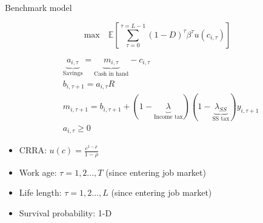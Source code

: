 \documentclass{beamer}
\begin{document}
\begin{frame}{Benchmark model}

\begin{equation*}
	\textrm{max}\quad  \mathbb{E}\left[\sum^{\tau=L-1}_{\tau=0}(1-D)^\tau\beta^\tau u(c_{i,\tau})\right] 
\end{equation*}



\begin{equation*}
	\begin{split}
		& \underbrace{a_{i,\tau}}_{\text{Savings}} = \underbrace{m_{i,\tau}}_{\text{Cash in hand}} - c_{i,\tau} \\
		& b_{i,\tau+1} = a_{i,\tau} R  \\
		& m_{i,\tau+1}   = b_{i,\tau+1}+(1-\underbrace{\lambda}_{\text{Income tax}})(1-\underbrace{\lambda_{SS}}_{\text{SS tax}})y_{i,\tau+1}\\
		& a_{i,\tau} \geq 0 
	\end{split}
\end{equation*}


\begin{itemize}
	\item CRRA: $u(c) = \frac{c^{1-\rho}}{1-\rho}$
	\item Work age: $\tau=1, 2...,T$ (since entering job market) 
	\item Life length: $\tau=1, 2...,L$  (since entering job market)
	\item Survival probability: 1-D
\end{itemize}

\end{frame}
\end{document}
